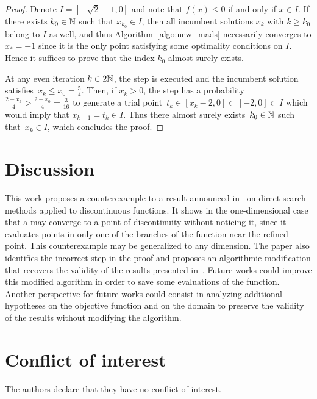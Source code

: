 \begin{proof}
	Denote $I = [-\sqrt{2}-1,0]$ and note that $f(x) \leq 0$ if and only if $x \in I$.
	If there exists $k_0 \in \mathbb{N}$ such that $x_{k_0} \in I$, then all incumbent solutions $x_k$ with $k \geq k_0$ belong to $I$ as well, and thus Algorithm~\ref{algo:new_mads} necessarily converges to $x_* = -1$ since it is the only point satisfying some optimality conditions on $I$.
	Hence it suffices to prove that the index $k_0$ almost surely exists.
	
	At any even iteration $k \in 2\mathbb{N}$, the \revpoll step is executed and the incumbent solution satisfies~$x_k \leq x_0 = \frac{5}{4}$.
	Then, if $x_k > 0$, the \revpoll step has a probability $\frac{2-x_k}{4} > \frac{2-x_0}{4} = \frac{3}{16}$ to generate a trial point~$t_k \in [x_k-2,0] \subset [-2,0] \subset I$ which would imply that $x_{k+1} = t_k \in I$.
	Thus there almost surely exists~$k_0 \in \mathbb{N}$ such that~$x_k \in I$, which concludes the proof.
\end{proof}




\section{Discussion}
\label{sec:Discussion}

This work proposes a counterexample to a result announced in~\cite{ViCu2012} on direct search methods applied to discontinuous functions.
It shows in the one-dimensional case that a \ddsm may converge to a point of discontinuity without noticing it, since it evaluates points in only one of the branches of the function near the refined point.
This counterexample may be generalized to any dimension.
The paper also identifies the incorrect step in the proof and proposes an algorithmic modification that recovers the validity of the results presented in~\cite{ViCu2012}.
Future works could improve this modified algorithm in order to save some evaluations of the function.
Another perspective for future works could consist in analyzing additional hypotheses on the objective function and on the domain to preserve the validity of the results without modifying the algorithm.




\section*{Conflict of interest}
The authors declare that they have no conflict of interest.





